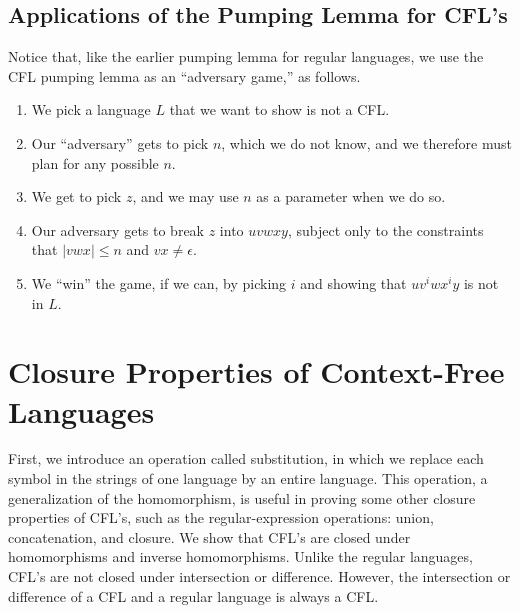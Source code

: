 \documentclass[]{article}
\begin{document}
  \subsection*{Applications of the Pumping Lemma for CFL's}
    Notice that, like the earlier pumping lemma for regular languages, we use
    the CFL pumping lemma as an ``adversary game,'' as follows.
      \begin{enumerate}
        \item We pick a language $L$ that we want to show is not a CFL.
        \item Our ``adversary'' gets to pick $n$, which we do not know, and we
        therefore must plan for any possible $n$.
        \item We get to pick $z$, and we may use $n$ as a parameter when we do
        so.
        \item Our adversary gets to break $z$ into $uvwxy$, subject only to the
        constraints that $|vwx| \leq n$ and $vx \neq \epsilon$.
        \item We ``win'' the game, if we can, by picking $i$ and showing that
        $uv^iwx^iy$ is not in $L$.
      \end{enumerate}

\section*{Closure Properties of Context-Free Languages}
  First, we introduce an operation called substitution, in which we replace each
  symbol in the strings of one language by an entire language. This operation, a
  generalization of the homomorphism, is useful in proving some other closure
  properties of CFL's, such as the regular-expression operations: union,
  concatenation, and closure. We show that CFL's are closed under homomorphisms
  and inverse homomorphisms. Unlike the regular languages, CFL's are not closed
  under intersection or difference. However, the intersection or difference of a
  CFL and a regular language is always a CFL.
\end{document}
